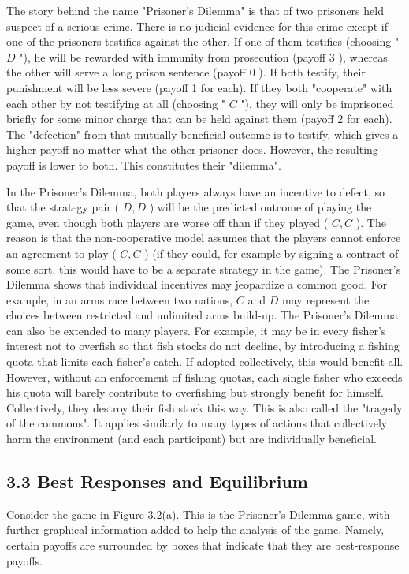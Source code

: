\documentclass[12pt]{article}
\begin{document}
The story behind the name "Prisoner's Dilemma" is that of two prisoners held suspect of a serious crime. There is no judicial evidence for this crime except if one of the prisoners testifies against the other. If one of them testifies (choosing " $D$ "), he will be rewarded with immunity from prosecution (payoff 3 ), whereas the other will serve a long prison sentence (payoff 0 ). If both testify, their punishment will be less severe (payoff 1 for each). If they both "cooperate" with each other by not testifying at all (choosing " $C$ "), they will only be imprisoned briefly for some minor charge that can be held against them (payoff 2 for each). The "defection" from that mutually beneficial outcome is to testify, which gives a higher payoff no matter what the other prisoner does. However, the resulting payoff is lower to both. This constitutes their "dilemma".

In the Prisoner's Dilemma, both players always have an incentive to defect, so that the strategy pair ( $D, D$ ) will be the predicted outcome of playing the\\
game, even though both players are worse off than if they played ( $C, C$ ). The reason is that the non-cooperative model assumes that the players cannot enforce an agreement to play ( $C, C$ ) (if they could, for example by signing a contract of some sort, this would have to be a separate strategy in the game). The Prisoner's Dilemma shows that individual incentives may jeopardize a common good. For example, in an arms race between two nations, $C$ and $D$ may represent the choices between restricted and unlimited arms build-up. The Prisoner's Dilemma can also be extended to many players. For example, it may be in every fisher's interest not to overfish so that fish stocks do not decline, by introducing a fishing quota that limits each fisher's catch. If adopted collectively, this would benefit all. However, without an enforcement of fishing quotas, each single fisher who exceeds his quota will barely contribute to overfishing but strongly benefit for himself. Collectively, they destroy their fish stock this way. This is also called the "tragedy of the commons". It applies similarly to many types of actions that collectively harm the environment (and each participant) but are individually beneficial.

\subsection*{3.3 Best Responses and Equilibrium}
Consider the game in Figure 3.2(a). This is the Prisoner's Dilemma game, with further graphical information added to help the analysis of the game. Namely, certain payoffs are surrounded by boxes that indicate that they are best-response payoffs.
\end{document}
